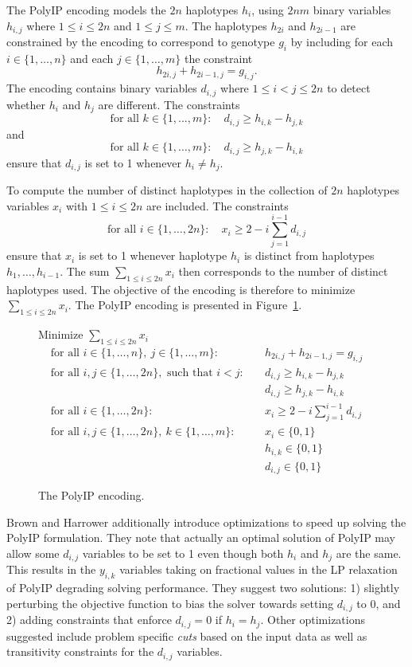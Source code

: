 \documentclass[12pt,a4paper]{article}
\begin{document}
The PolyIP encoding models the $2n$ haplotypes $h_i$, using $2nm$ binary variables $h_{i,j}$ where $1\leq i \leq 2n$ and $1\leq j \leq m$.
The haplotypes $h_{2i}$ and $h_{2i-1}$ are constrained by the encoding to correspond to genotype $g_i$ by including for each $i\in\{1, \dots , n\}$ and each $j\in\{1,\dots ,m\}$ the constraint
$$ h_{2i,j} + h_{2i-1,j} = g_{i,j}. $$
The encoding contains binary variables $d_{i,j}$ where $1\leq i<j\leq 2n$ to detect whether $h_i$ and $h_j$ are different.
The constraints 
$$ \text{for all }k\in\{1,\dots ,m\}:\quad  d_{i,j} \geq h_{i,k}-h_{j,k} $$
and
$$ \text{for all }k\in\{1,\dots ,m\}:\quad  d_{i,j} \geq h_{j,k}-h_{i,k} $$
ensure that $d_{i,j}$ is set to 1 whenever $h_i\neq h_j$.

To compute the number of distinct haplotypes in the collection of $2n$ haplotypes variables $x_i$ with $1\leq i\leq 2n$ are included.
The constraints
$$ \text{for all }i\in\{1,\dots ,2n\}:\quad  x_{i} \geq 2 - i \sum_{j=1}^{i-1} d_{i,j} $$
ensure that $x_i$ is set to 1 whenever haplotype $h_i$ is distinct from haplotypes $h_1,\dots , h_{i-1}$.
The sum $\sum_{1\leq i\leq 2n} x_i$ then corresponds to the number of distinct haplotypes used.
The objective of the encoding is therefore to minimize $\sum_{1\leq i\leq 2n} x_i$.
The PolyIP encoding is presented in Figure~\ref{fig:enc-polyip}.

\begin{figure}
\centering
Minimize $\sum_{1\leq i \leq 2n} x_i$
\begin{align}
\text{for all  }i\in\{1,\dots , n\},\ j\in\{1,\dots ,m\}:&\quad h_{2i,j} + h_{2i-1,j} = g_{i,j} \\
\text{for all  }i, j\in\{1,\dots , 2n\},\text{ such that } i<j:&\quad d_{i,j} \geq h_{i,k}-h_{j,k} \\
&\quad d_{i,j} \geq h_{j,k}-h_{i,k} \\
\text{for all  }i\in\{1,\dots , 2n\}:&\quad x_{i} \geq 2 - i \sum_{j=1}^{i-1} d_{i,j} \\
\text{for all  }i,j\in\{1,\dots , 2n\},\ k\in\{1,\dots ,m\}:&\quad x_i\in\{0,1\} \\
&\quad h_{i,k}\in\{0,1\} \\
&\quad d_{i,j}\in\{0,1\}
\end{align}
\caption{The PolyIP encoding.}
\label{fig:enc-polyip}
\end{figure}

Brown and Harrower additionally introduce optimizations to speed up solving the PolyIP formulation.
They note that actually an optimal solution of PolyIP may allow some $d_{i,j}$ variables to be set to 1 even though both $h_i$ and $h_j$ are the same.  
This results in the $y_{i,k}$ variables taking on fractional values in the LP relaxation of PolyIP degrading solving performance.
They suggest two solutions: 1) slightly perturbing the objective function to bias the solver towards setting $d_{i,j}$ to 0, 
and 2) adding constraints that enforce $d_{i,j}=0$ if $h_i=h_j$.
Other optimizations suggested include problem specific \emph{cuts} based on the input data as well as transitivity constraints for the $d_{i,j}$ variables.
\end{document}

